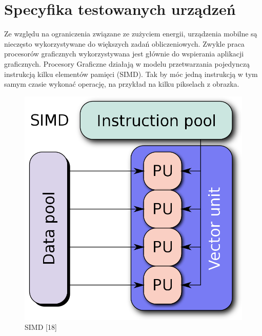 \section[Specyfika testowanych urządzeń]{Specyfika testowanych urządzeń}
Ze względu na ograniczenia związane ze zużyciem energii, urządzenia mobilne są nieczęsto wykorzystywane do większych zadań obliczeniowych. Zwykle praca procesorów graficznych wykorzystywana jest głównie do wspierania aplikacji graficznych. Procesory Graficzne działają w modelu przetwarzania pojedynczą instrukcją kilku elementów pamięci (SIMD). Tak by móc jedną instrukcją w tym samym czasie wykonać operację, na przykład na kilku pikselach z obrazka. 
\begin{figure}[H]
	\includegraphics[scale=0.16]{imgs/SIMD2.svg.png}
	\caption{SIMD [18]}
\end{figure}

